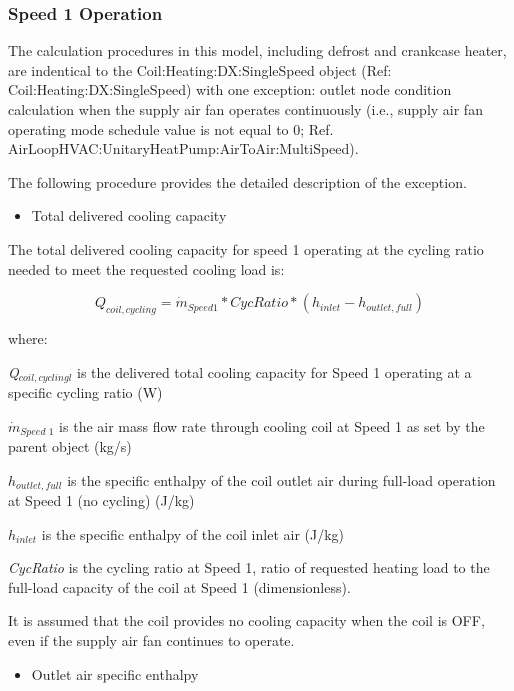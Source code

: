 \subsubsection{Speed 1 Operation}\label{speed-1-operation}

The calculation procedures in this model, including defrost and crankcase heater, are indentical to the Coil:Heating:DX:SingleSpeed object (Ref: Coil:Heating:DX:SingleSpeed) with one exception: outlet node condition calculation when the supply air fan operates continuously (i.e., supply air fan operating mode schedule value is not equal to 0; Ref. AirLoopHVAC:UnitaryHeatPump:AirToAir:MultiSpeed).

The following procedure provides the detailed description of the exception.

\begin{itemize}
  \item Total delivered cooling capacity
\end{itemize}

The total delivered cooling capacity for speed 1 operating at the cycling ratio needed to meet the requested cooling load is:

\begin{equation}
{Q_{coil,cycling}} = {\dot{m}_{Speed1}}*CycRatio*({h_{inlet}} - {h_{outlet,full}})
\end{equation}

where:

\emph{Q\(_{coil,cyclingl}\)} is the delivered total cooling capacity for Speed 1 operating at a specific cycling ratio (W)

\({\dot{m}_{Speed\,\,1}}\) is the air mass flow rate through cooling coil at Speed 1 as set by the parent object (kg/s)

\(h_{outlet,full}\) is the specific enthalpy of the coil outlet air during full-load operation at Speed 1 (no cycling) (J/kg)

\(h_{inlet}\) is the specific enthalpy of the coil inlet air (J/kg)

\emph{CycRatio} is the cycling ratio at Speed 1, ratio of requested heating load to the full-load capacity of the coil at Speed 1 (dimensionless).

It is assumed that the coil provides no cooling capacity when the coil is OFF, even if the supply air fan continues to operate.

\begin{itemize}
  \item Outlet air specific enthalpy
\end{itemize}

